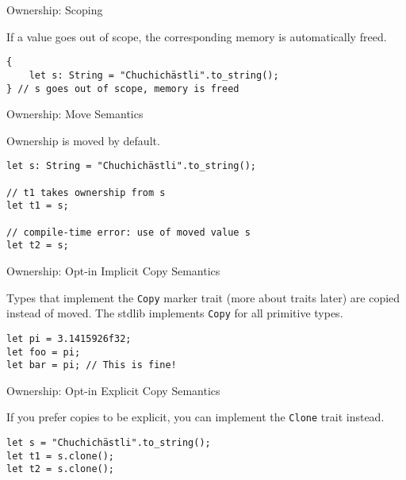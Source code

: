 
\begin{frame}[fragile]{Ownership: Scoping}

If a value goes out of scope, the corresponding memory is automatically freed.

\begin{verbatim}
{
    let s: String = "Chuchichästli".to_string();
} // s goes out of scope, memory is freed
\end{verbatim}

\end{frame}


\begin{frame}[fragile]{Ownership: Move Semantics}

Ownership is moved by default.

\begin{verbatim}
let s: String = "Chuchichästli".to_string();

// t1 takes ownership from s
let t1 = s;

// compile-time error: use of moved value s
let t2 = s;
\end{verbatim}

\end{frame}


\begin{frame}[fragile]{Ownership: Opt-in Implicit Copy Semantics}

Types that implement the \texttt{Copy} marker trait (more about traits later)
are copied instead of moved. The stdlib implements \texttt{Copy} for all
primitive types.

\begin{verbatim}
let pi = 3.1415926f32;
let foo = pi;
let bar = pi; // This is fine!
\end{verbatim}

\end{frame}


\begin{frame}[fragile]{Ownership: Opt-in Explicit Copy Semantics}

If you prefer copies to be explicit, you can implement the \texttt{Clone} trait
instead.

\begin{verbatim}
let s = "Chuchichästli".to_string();
let t1 = s.clone();
let t2 = s.clone();
\end{verbatim}

\end{frame}

